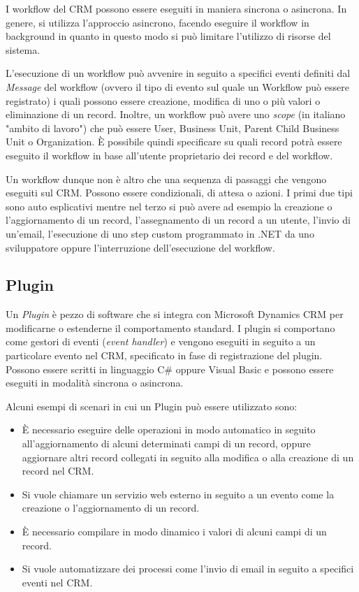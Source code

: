 I workflow del CRM possono essere eseguiti in maniera sincrona o asincrona. In genere, si utilizza l'approccio asincrono, facendo eseguire il workflow in background in quanto in questo modo si può limitare l'utilizzo di risorse del sistema.

L'esecuzione di un workflow può avvenire in seguito a specifici eventi definiti dal \textit{Message} del workflow (ovvero il tipo di evento sul quale un Workflow può essere registrato) i quali possono essere creazione, modifica di uno o più valori o eliminazione di un record. Inoltre, un workflow può avere uno \textit{scope} (in italiano "ambito di lavoro") che può essere User, Business Unit, Parent Child Business Unit o Organization. È possibile quindi specificare su quali record potrà essere eseguito il workflow in base all'utente proprietario dei record e del workflow.

Un workflow dunque non è altro che una sequenza di passaggi che vengono eseguiti sul CRM. Possono essere condizionali, di attesa o azioni. I primi due tipi sono auto esplicativi mentre nel terzo si può avere ad esempio la creazione o l'aggiornamento di un record, l'assegnamento di un record a un utente, l'invio di un'email, l'esecuzione di uno step custom programmato in .NET da uno sviluppatore oppure l'interruzione dell'esecuzione del workflow.~\cite{DynamicsTutorialspoint}

\subsection{Plugin}
Un \textit{Plugin} è pezzo di software che si integra con Microsoft Dynamics CRM per modificarne o estenderne il comportamento standard. I plugin si comportano come gestori di eventi (\textit{event handler}) e vengono eseguiti in seguito a un particolare evento nel CRM, specificato in fase di registrazione del plugin. Possono essere scritti in linguaggio C\# oppure Visual Basic e possono essere eseguiti in modalità sincrona o asincrona.

Alcuni esempi di scenari in cui un Plugin può essere utilizzato sono:
\begin{itemize}
  \item È necessario eseguire delle operazioni in modo automatico in seguito all'aggiornamento di alcuni determinati campi di un record, oppure aggiornare altri record collegati in seguito alla modifica o alla creazione di un record nel CRM.
  \item Si vuole chiamare un servizio web esterno in seguito a un evento come la creazione o l'aggiornamento di un record.
  \item È necessario compilare in modo dinamico i valori di alcuni campi di un record.
  \item Si vuole automatizzare dei processi come l'invio di email in seguito a specifici eventi nel CRM.
\end{itemize}

